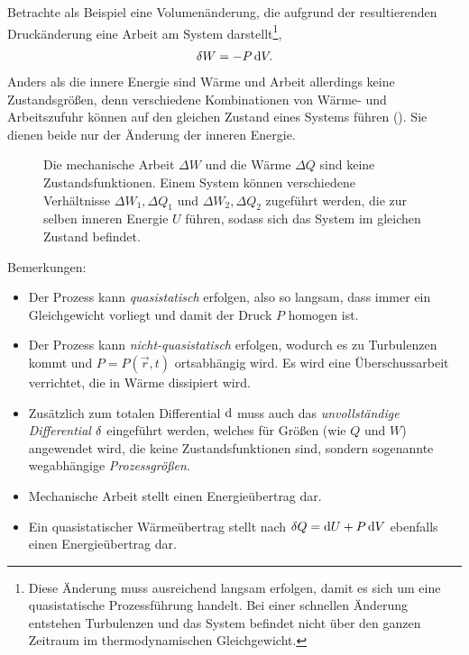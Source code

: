 
Betrachte als Beispiel eine Volumenänderung, die aufgrund der resultierenden Druckänderung eine Arbeit am System darstellt\footnote{Diese Änderung muss ausreichend langsam erfolgen, damit es sich um eine quasistatische Prozessführung handelt. Bei einer schnellen Änderung entstehen Turbulenzen und das System befindet nicht über den ganzen Zeitraum im thermodynamischen Gleichgewicht.},
\begin{align*}
    \mathop{}\!\delta W = -P\mathop{}\!\mathrm{d} V.
\end{align*}
Anders als die innere Energie sind Wärme und Arbeit allerdings keine Zustandsgrößen, denn verschiedene Kombinationen von Wärme- und Arbeitszufuhr können auf den gleichen Zustand eines Systems führen (). Sie dienen beide nur der Änderung der inneren Energie.

\begin{figure}[htb]
    \centering
    \tfigWQAreNoStateFunctions
    \caption{Die mechanische Arbeit $\Delta W$ und die Wärme $\Delta Q$ sind keine Zustandsfunktionen. Einem System können verschiedene Verhältnisse $\Delta W_1,\Delta Q_1$ und $\Delta W_2,\Delta Q_2$ zugeführt werden, die zur selben inneren Energie $U$ führen, sodass sich das System im gleichen Zustand befindet. }
    \label{fig:WQAreNoStateFunctions}
\end{figure}


Bemerkungen:
\begin{itemize}
    \item Der Prozess kann \emph{quasistatisch} erfolgen, also so langsam, dass immer ein Gleichgewicht vorliegt und damit der Druck $P$ homogen ist.
    \item Der Prozess kann \emph{nicht-quasistatisch} erfolgen, wodurch es zu Turbulenzen kommt und $P=P(\vec r,t)$ ortsabhängig wird. Es wird eine Überschussarbeit verrichtet, die in Wärme dissipiert wird.
    \item Zusätzlich zum totalen Differential $\mathop{}\!\mathrm{d}$ muss auch das \emph{unvollständige Differential} $\mathop{}\!\delta$ eingeführt werden, welches für Größen (wie $Q$ und $W$) angewendet wird, die keine Zustandsfunktionen sind, sondern sogenannte wegabhängige \emph{Prozessgrößen}.
    \item Mechanische Arbeit stellt einen Energieübertrag dar.
    \item Ein quasistatischer Wärmeübertrag stellt nach $\mathop{}\!\delta Q=\mathop{}\!\mathrm{d} U+P\mathop{}\!\mathrm{d} V$ ebenfalls einen Energieübertrag dar.
\end{itemize}


